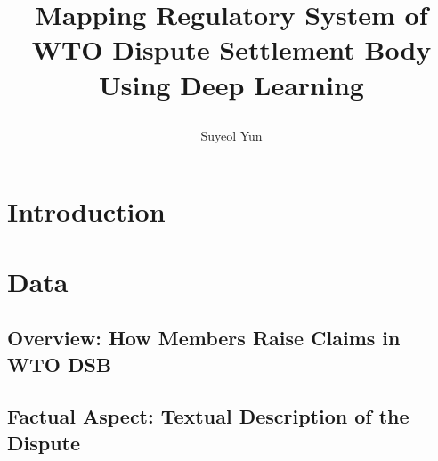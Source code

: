 \documentclass[12pt,letterpaper]{article}
\newcommand{\tit}{
\bf 
Mapping Regulatory System of WTO Dispute Settlement Body Using Deep Learning
}
\newcommand\spacingset[1]{\renewcommand{\baselinestretch}
{#1}\small\normalsize}
\begin{document}
\spacingset{1.25}

\setcounter{page}{0}
\vspace{-.1in}

{\title{
    \tit
  }
  \author{Suyeol Yun
  }
  \maketitle
}

\thispagestyle{empty}
\vspace{-.1in}

\begin{abstract}
\end{abstract}

\spacingset{1.5} %

% 


\section{Introduction}











\section{Data}


\subsection{Overview: How Members Raise Claims in WTO DSB}



% 
\subsection{Factual Aspect: Textual Description of the Dispute}

\end{document}
